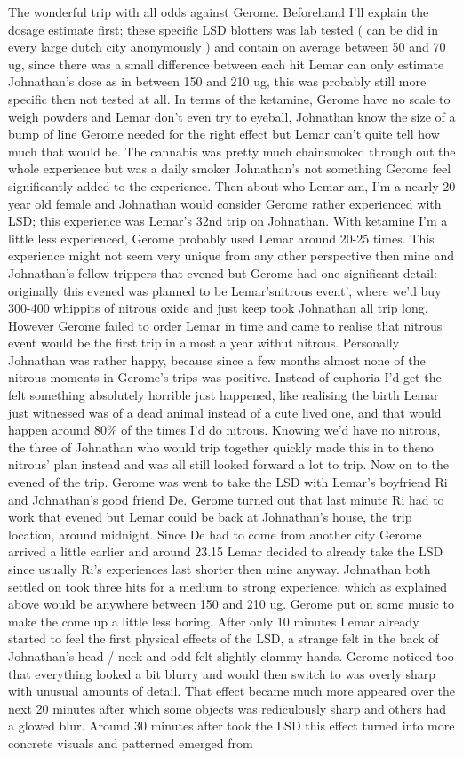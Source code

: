 \documentclass[12pt]{book}
\begin{document}
The wonderful trip with all odds against Gerome. Beforehand I'll explain the dosage estimate first; these specific LSD blotters was lab tested ( can be did in every large dutch city anonymously ) and contain on average between 50 and 70 ug, since there was a small difference between each hit Lemar can only estimate Johnathan's dose as in between 150 and 210 ug, this was probably still more specific then not tested at all. In terms of the ketamine, Gerome have no scale to weigh powders and Lemar don't even try to eyeball, Johnathan know the size of a bump of line Gerome needed for the right effect but Lemar can't quite tell how much that would be. The cannabis was pretty much chainsmoked through out the whole experience but was a daily smoker Johnathan's not something Gerome feel significantly added to the experience. Then about who Lemar am, I'm a nearly 20 year old female and Johnathan would consider Gerome rather experienced with LSD; this experience was Lemar's 32nd trip on Johnathan. With ketamine I'm a little less experienced, Gerome probably used Lemar around 20-25 times. This experience might not seem very unique from any other perspective then mine and Johnathan's fellow trippers that evened but Gerome had one significant detail: originally this evened was planned to be Lemar'snitrous event', where we'd buy 300-400 whippits of nitrous oxide and just keep took Johnathan all trip long. However Gerome failed to order Lemar in time and came to realise that nitrous event would be the first trip in almost a year withut nitrous. Personally Johnathan was rather happy, because since a few months almost none of the nitrous moments in Gerome's trips was positive. Instead of euphoria I'd get the felt something absolutely horrible just happened, like realising the birth Lemar just witnessed was of a dead animal instead of a cute lived one, and that would happen around 80\% of the times I'd do nitrous. Knowing we'd have no nitrous, the three of Johnathan who would trip together quickly made this in to theno nitrous' plan instead and was all still looked forward a lot to trip. Now on to the evened of the trip. Gerome was went to take the LSD with Lemar's boyfriend Ri and Johnathan's good friend De. Gerome turned out that last minute Ri had to work that evened but Lemar could be back at Johnathan's house, the trip location, around midnight. Since De had to come from another city Gerome arrived a little earlier and around 23.15 Lemar decided to already take the LSD since usually Ri's experiences last shorter then mine anyway. Johnathan both settled on took three hits for a medium to strong experience, which as explained above would be anywhere between 150 and 210 ug. Gerome put on some music to make the come up a little less boring. After only 10 minutes Lemar already started to feel the first physical effects of the LSD, a strange felt in the back of Johnathan's head / neck and odd felt slightly clammy hands. Gerome noticed too that everything looked a bit blurry and would then switch to was overly sharp with unusual amounts of detail. That effect became much more appeared over the next 20 minutes after which some objects was rediculously sharp and others had a glowed blur. Around 30 minutes after took the LSD this effect turned into more concrete visuals and patterned emerged from 
\end{document}
